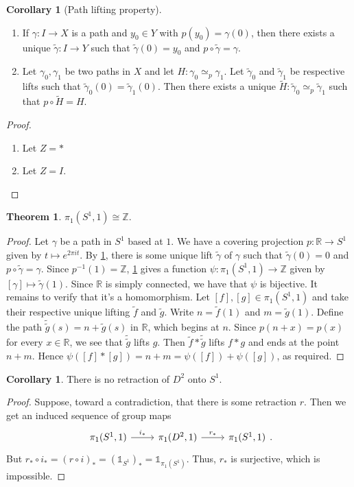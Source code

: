 \documentclass[10pt,letterpaper,cm]{nupset}
\theoremstyle{definition}
\theoremstyle{theorem}
\newtheorem{theorem}[definition]{Theorem}
\newtheorem{corollary}[definition]{Corollary}
\theoremstyle{remark}
\newcommand{\R}{\mathbb{R}}
\newcommand{\Z}{\mathbb Z}
\newcommand{\1}{\mathbb{1}}
\newcommand{\0}{\vec 0}
\begin{document}
\begin{corollary}[Path lifting property]\label{cor1} $ $
\begin{enumerate}
\item If $\gamma : I \to X$ is a path and $y_0 \in Y$ with $p(y_0) = \gamma(0)$, then there exists a unique $\tilde{\gamma} : I \to Y$ such that $\tilde{\gamma}(0) = y_0$ and $p \circ \tilde{\gamma} = \gamma$.
\item Let $\gamma_0, \gamma_1$ be two paths in $X$ and let $H : \gamma_0 \simeq_p \gamma_1$. Let $\tilde{\gamma}_0$ and $\tilde{\gamma}_1$ be respective lifts such that $\tilde{\gamma}_0 (0) = \tilde{\gamma}_1(0)$. Then there exists a unique $\widetilde{H} : \tilde{\gamma}_0 \simeq_p \tilde{\gamma}_1$ such that $p \circ \widetilde{H} = H$.
\end{enumerate}
\end{corollary}
\begin{proof} $ $
\begin{enumerate}
\item Let $Z = \ast$
\item Let $Z = I$.
\end{enumerate}
\end{proof}

\begin{theorem}
$\pi_1(S^1, 1) \cong \Z$.
\end{theorem}
\begin{proof}
Let $\gamma$ be a path in $S^1$ based at $1$. We have a covering projection $p: \R \to S^1$ given by $t\mapsto e^{2\pi i t}$. By \cref{cor1}, there is some unique lift $\tilde{\gamma}$ of $\gamma$ such that $\tilde{\gamma}(0) = 0$ and $p \circ \tilde{\gamma} = \gamma$. Since $p^{-1}(1) = \Z$, \cref{cor1} gives a function $\psi: \pi_1(S^1, 1) \to \Z$ given by $[\gamma ] \mapsto \tilde{\gamma}(1)$. Since $\R$ is simply connected, we have that $\psi$ is bijective. It remains to verify that it's a homomorphism. Let $[f], [g] \in \pi_1(S^1, 1)$ and take their respective unique lifting $\tilde{f}$ and $\tilde{g}$. Write $n = \tilde{f}(1)$ and $m= \tilde{g}(1)$. Define the path $\tilde{\tilde{g}}(s) = n+ \tilde{g}(s)$ in $\R$, which begins at $n$. Since $p(n+x) = p(x)$ for every $x\in \R$, we see that $\tilde{\tilde{g}}$ lifts $g$. Then $\tilde{f} \ast \tilde{\tilde{g}}$ lifts $f \ast g$ and ends at the point $n+m$. Hence $\psi([f] \ast [g]) = n+m = \psi([f])  + \psi([g])$, as required. 
\end{proof}


\begin{corollary}
There is no retraction of $D^2$ onto $S^1$.
\end{corollary}
\begin{proof}
Suppose, toward a contradiction, that there is some retraction $r$. Then we get an induced sequence of group maps
\[
\begin{tikzcd}
{\pi_1(S^1, 1)} \arrow[r, "i_{\ast}"] & {\pi_1(D^2, 1)} \arrow[r, "r_{\ast}"] & {\pi_1(S^1, 1)}
\end{tikzcd}
.\] But $r_{\ast} \circ i_{\ast} = \left(r \circ i\right)_{\ast} = \left(\1_{S^1}\right)_{\ast} = \1_{\pi_1(S^1)}$. Thus, $r_{\ast}$ is surjective, which is impossible. 
\end{proof}
\end{document}
